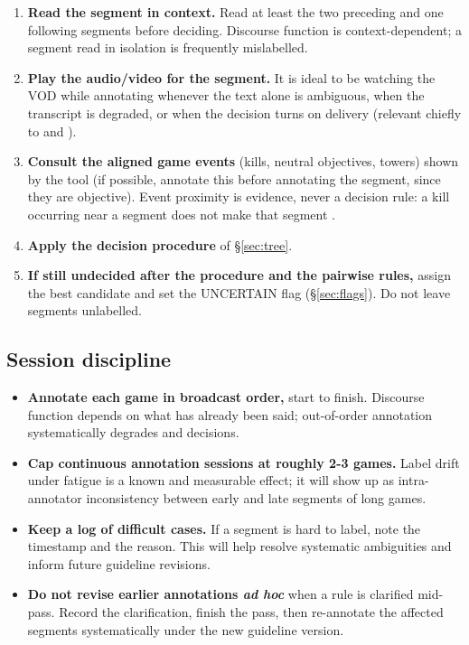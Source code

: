 \begin{enumerate}
  \item \textbf{Read the segment in context.} Read at least the two preceding and one following segments before deciding. Discourse function is context-dependent; a segment read in isolation is frequently mislabelled.
  \item \textbf{Play the audio/video for the segment.} It is ideal to be watching the VOD while annotating whenever the text alone is ambiguous, when the transcript is degraded, or when the decision turns on delivery (relevant chiefly to \HYP{} and \BAN{}).
  \item \textbf{Consult the aligned game events} (kills, neutral objectives, towers) shown by the tool (if possible, annotate this before annotating the segment, since they are objective). Event proximity is evidence, never a decision rule: a kill occurring near a segment does not make that segment \PBP{}.
  \item \textbf{Apply the decision procedure} of \S\ref{sec:tree}.
  \item \textbf{If still undecided after the procedure and the pairwise rules,} assign the best candidate and set the \textsf{UNCERTAIN} flag (\S\ref{sec:flags}). Do not leave segments unlabelled.
\end{enumerate}

\subsection{Session discipline}

\begin{itemize}
  \item {} \textbf{Annotate each game in broadcast order,} start to finish. Discourse function depends on what has already been said; out-of-order annotation systematically degrades \REC{} and \STO{} decisions.

  \item {} \textbf{Cap continuous annotation sessions at roughly 2-3 games.} Label drift under fatigue is a known and measurable effect; it will show up as intra-annotator inconsistency between early and late segments of long games.
  
  \item {} \textbf{Keep a log of difficult cases.} If a segment is hard to label, note the timestamp and the reason. This will help resolve systematic ambiguities and inform future guideline revisions.

  \item {} \textbf{Do not revise earlier annotations \textit{ad hoc}} when a rule is clarified mid-pass. Record the clarification, finish the pass, then re-annotate the affected segments systematically under the new guideline version.
\end{itemize}

